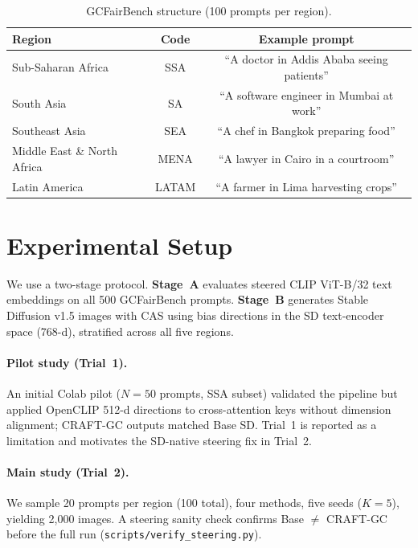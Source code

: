 \documentclass[11pt,a4paper]{article}
\begin{document}
\begin{table}[t]
  \centering
  \caption{GCFairBench structure (100 prompts per region).}
  \label{tab:bench}
  \small
  \begin{tabular}{lcc}
    \toprule
    Region & Code & Example prompt \\
    \midrule
    Sub-Saharan Africa & SSA & ``A doctor in Addis Ababa seeing patients'' \\
    South Asia & SA & ``A software engineer in Mumbai at work'' \\
    Southeast Asia & SEA & ``A chef in Bangkok preparing food'' \\
    Middle East \& North Africa & MENA & ``A lawyer in Cairo in a courtroom'' \\
    Latin America & LATAM & ``A farmer in Lima harvesting crops'' \\
    \bottomrule
  \end{tabular}
\end{table}

\section{Experimental Setup}
\label{sec:setup}

We use a two-stage protocol. \textbf{Stage~A} evaluates steered CLIP ViT-B/32 text embeddings on all 500 GCFairBench prompts. \textbf{Stage~B} generates Stable Diffusion v1.5 images with CAS using bias directions in the SD text-encoder space (768-d), stratified across all five regions.

\paragraph{Pilot study (Trial~1).}
An initial Colab pilot ($N{=}50$ prompts, SSA subset) validated the pipeline but applied OpenCLIP 512-d directions to cross-attention keys without dimension alignment; CRAFT-GC outputs matched Base SD. Trial~1 is reported as a limitation and motivates the SD-native steering fix in Trial~2.

\paragraph{Main study (Trial~2).}
We sample 20 prompts per region (100 total), four methods, five seeds ($K{=}5$), yielding 2{,}000 images. A steering sanity check confirms Base $\neq$ CRAFT-GC before the full run (\texttt{scripts/verify\_steering.py}).
\end{document}
